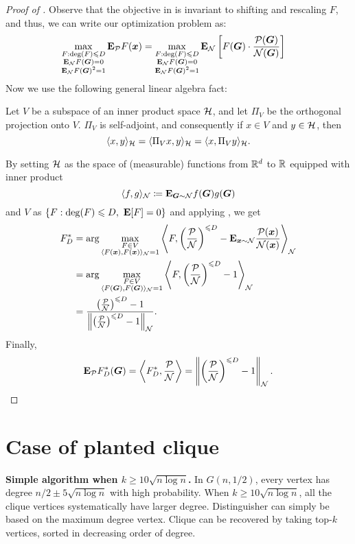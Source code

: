 \documentclass[11pt, letterpaper]{article}
\newcommand{\Null}{\calN}
\newcommand{\Planted}{\calP}
\begin{document}
\begin{proof}[Proof of ]
Observe that the objective in  is invariant to shifting and rescaling $F$, and thus, we can write our optimization problem as:
\begin{align*}
    \max_{\substack{F:\deg(F)\le D\\ \E_{\Null}F(\bG) = 0 \\ \E_{\Null}F(\bG)^2=1}} \E_{\Planted}F(\bx) &= \max_{\substack{F:\deg(F)\le D\\ \E_{\Null}F(\bG) = 0 \\ \E_{\Null}F(\bG)^2=1}} \E_{\Null}\left[F(\bG)\cdot\frac{\Planted(\bG)}{\Null(\bG)}\right] 
\end{align*}
Now we use the following general linear algebra fact:
\begin{fact}    \label{fact:orth-proj-self-adj}
Let $V$ be a subspace of an inner product space $\mathcal H$, and let $\Pi_V$ be the orthogonal projection onto $V$.  $\Pi_V$ is self-adjoint, and consequently if $x\in V$ and $y\in\mathcal H$, then
\[
\langle x, y\rangle_{\mathcal H} = \langle \Pi_V x, y\rangle_{\mathcal H} = \langle x, \Pi_V y\rangle_{\mathcal H}.
\]
\end{fact}
By setting $\mathcal H$ as the space of (measurable) functions from $\mathbb R^d$ to $\mathbb R$ equipped with inner product
\[
    \langle f, g\rangle_{\Null} \coloneqq \E_{\bG\sim\Null}f(\bG)g(\bG)
\]
and $V$ as $\{F:\deg(F)\leqslant D,~\mathbf{E}[F]=0\}$ and applying , we get
\begin{align*}
    F^*_D &= \arg\max_{\substack{F\in V \\ \langle F(\bx),F(\bx)\rangle_{\Null}=1}} \left\langle F,\left(\frac{\Planted}{\Null}\right)^{\le D}-\E_{\bx\sim\Null}\frac{\Planted(\bx)}{\Null(\bx)}\right\rangle_{\Null}\\
    &= \arg\max_{\substack{F\in V \\ \langle F(\bG),F(\bG)\rangle_{\Null}=1}} \left\langle F,\left(\frac{\Planted}{\Null}\right)^{\le D}-1\right\rangle_{\Null}\\
    &= \frac{\left(\frac{\Planted}{\Null}\right)^{\le D}-1}{\left\|\left(\frac{\Planted}{\Null}\right)^{\le D}-1\right\|_{\Null}}.
\end{align*}
Finally,
\[
    \E_{\Planted}F^*_D(\bG) = \left\langle F^*_D, \frac{\Planted}{\Null}\right\rangle = \left\|\left(\frac{\Planted}{\Null}\right)^{\le D}-1\right\|_{\Null}.   \qedhere
\]
\end{proof}


\section{Case of planted clique}
{\bf Simple algorithm when $k \ge 10\sqrt{n\log n}$.}
In $G(n,1/2)$, every vertex has degree $n/2\pm 5\sqrt{n\log n}$ with high probability.
When $k\ge 10\sqrt{n\log n}$, all the clique vertices systematically have larger degree.
Distinguisher can simply be based on the maximum degree vertex.
Clique can be recovered by taking top-$k$ vertices, sorted in decreasing order of degree.
\end{document}
